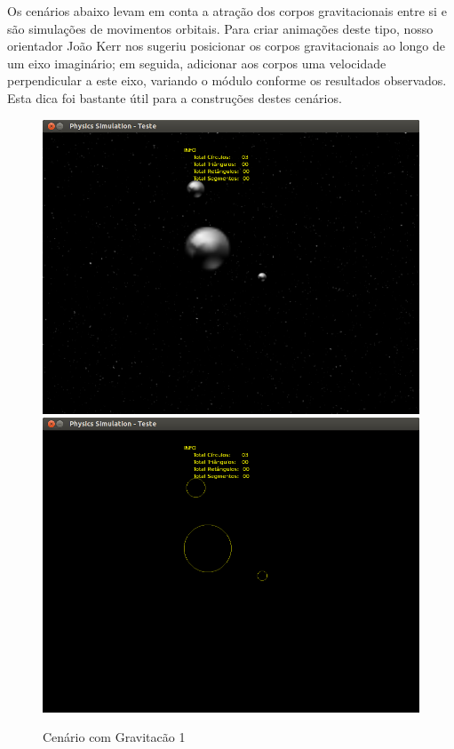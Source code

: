 Os cenários abaixo levam em conta a atração dos corpos gravitacionais entre si e são simulações de movimentos orbitais. Para criar animações deste tipo, nosso orientador João Kerr nos sugeriu posicionar os corpos gravitacionais ao longo de um eixo imaginário; em seguida, adicionar aos corpos uma velocidade perpendicular a este eixo, variando o módulo conforme os resultados observados. Esta dica foi bastante útil para a construções destes cenários.

\begin{figure}[H]
	\centering
	\includegraphics[scale=0.2]{images/cenario-gravitacao-2.png}
	\includegraphics[scale=0.2]{images/cenario-gravitacao.png}
	\caption{Cenário com Gravitacão 1}
\end{figure}

